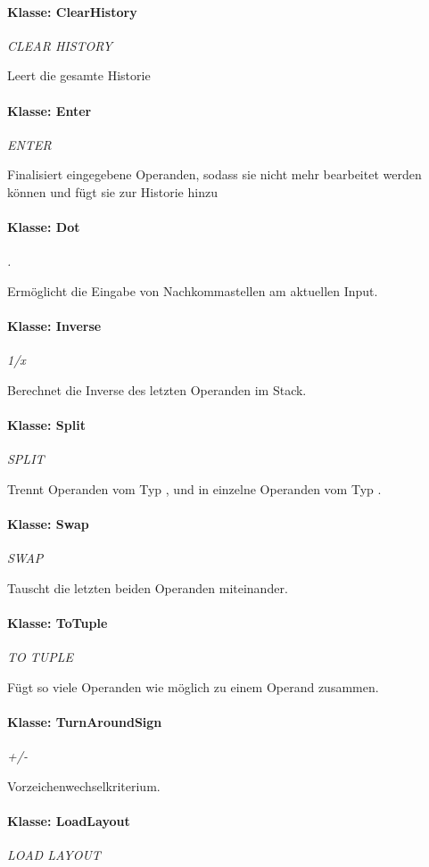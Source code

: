 \paragraph{Klasse: ClearHistory}
\textit{CLEAR HISTORY}

Leert die gesamte Historie
\paragraph{Klasse: Enter}
\textit{ENTER}

Finalisiert eingegebene Operanden, sodass sie nicht mehr bearbeitet werden können und fügt sie zur Historie hinzu
\paragraph{Klasse: Dot}
\textit{.}

Ermöglicht die Eingabe von Nachkommastellen am aktuellen Input.
\paragraph{Klasse: Inverse}
\textit{1/x}

Berechnet die Inverse des letzten Operanden im Stack.
\paragraph{Klasse: Split}
\textit{SPLIT}

Trennt Operanden vom Typ ,  und  in einzelne Operanden vom Typ .
\paragraph{Klasse: Swap}
\textit{SWAP}

Tauscht die letzten beiden Operanden miteinander.
\paragraph{Klasse: ToTuple}
\textit{TO TUPLE}

Fügt so viele Operanden wie möglich zu einem  Operand zusammen.
\paragraph{Klasse: TurnAroundSign}
\textit{+/-}

Vorzeichenwechselkriterium.
\paragraph{Klasse: LoadLayout}
\textit{LOAD LAYOUT}

